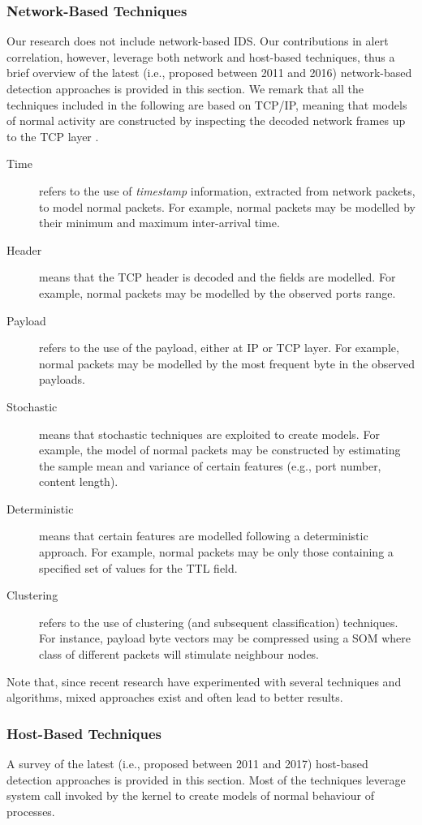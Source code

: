 \documentclass[12pt]{article}
\theoremstyle{definition}
\begin{document}
		
			\subsubsection{Network-Based Techniques}
			Our research does not include network-based IDS. Our contributions in alert correlation, however, leverage both network and host-based techniques, thus a brief overview of the latest (i.e., proposed between 2011 and 2016) network-based detection approaches is provided in this section. We remark that all the techniques included in the following are based on TCP/IP, meaning that models of normal activity are constructed by inspecting the decoded network frames up to the TCP layer \cite{Zarpelao2017}.
			
			\begin{description}
				\item[Time] refers to the use of \emph{timestamp} information,
				extracted from network packets, to model normal packets. For example,
				normal packets may be modelled by their minimum and maximum inter-arrival time.
				\item[Header] means that the TCP header is decoded and the fields are modelled. For example, normal packets may be modelled by
				the observed ports range.
				\item[Payload] refers to the use of the payload, either at
				IP or TCP layer. For example, normal packets may be modelled by the most frequent byte in the observed payloads.
				\item[Stochastic] means that stochastic techniques are exploited to
				create models. For example, the model of normal packets may be constructed by estimating the sample mean and variance of certain features (e.g., port number, content length).
				\item[Deterministic] means that certain features are modelled following
				a deterministic approach. For example, normal packets may be only
				those containing a specified set of values for the TTL field.
				\item[Clustering] refers to the use of clustering (and subsequent classification) techniques. For instance, payload byte vectors may be
				compressed using a SOM where class of different packets will stimulate neighbour nodes.
			\end{description}
			
			Note that, since recent research have experimented with several
			techniques and algorithms, mixed approaches exist and often lead to
			better results.
			\subsubsection{Host-Based Techniques}
			A survey of the latest (i.e., proposed
			between 2011 and 2017) host-based detection approaches is provided in
			this section. Most of the techniques leverage system call invoked by
			the kernel to create models of normal behaviour of processes.
			
\end{document}
